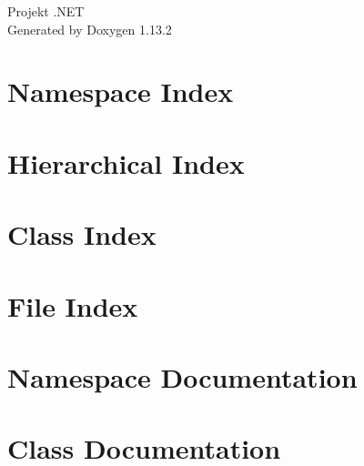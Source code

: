 \documentclass[twoside]{book}
\newcommand{\+}{\discretionary{\mbox{\scriptsize$\hookleftarrow$}}{}{}}
\newcommand{\clearemptydoublepage}{%
    \newpage{\pagestyle{empty}\cleardoublepage}%
  }
\begin{document}
  \raggedbottom
    \hypersetup{pageanchor=false,
                bookmarksnumbered=true,
                pdfencoding=unicode
               }
  \begin{titlepage}
  \vspace*{7cm}
  \begin{center}%
  {\Large Projekt .\+NET}\\
  \vspace*{1cm}
  {\large Generated by Doxygen 1.13.2}\\
  \end{center}
  \end{titlepage}
  \clearemptydoublepage
  \tableofcontents
  \clearemptydoublepage
  \hypersetup{pageanchor=true}

\chapter{Namespace Index}

\chapter{Hierarchical Index}

\chapter{Class Index}

\chapter{File Index}

\chapter{Namespace Documentation}






\chapter{Class Documentation}









\end{document}
